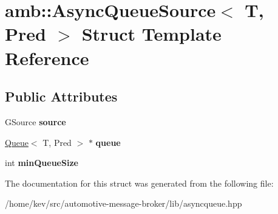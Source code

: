 \hypertarget{structamb_1_1AsyncQueueSource}{\section{amb\+:\+:Async\+Queue\+Source$<$ T, Pred $>$ Struct Template Reference}
\label{structamb_1_1AsyncQueueSource}
}
\subsection*{Public Attributes}
\begin{DoxyCompactItemize}
\item 
\hypertarget{structamb_1_1AsyncQueueSource_a24c5fe3fdd11cfa92ec95ad440966572}{G\+Source {\bfseries source}}\label{structamb_1_1AsyncQueueSource_a24c5fe3fdd11cfa92ec95ad440966572}

\item 
\hypertarget{structamb_1_1AsyncQueueSource_ac43bbfc0e2112f433ef4cb908fb5e8fc}{\hyperlink{classamb_1_1Queue}{Queue}$<$ T, Pred $>$ $\ast$ {\bfseries queue}}\label{structamb_1_1AsyncQueueSource_ac43bbfc0e2112f433ef4cb908fb5e8fc}

\item 
\hypertarget{structamb_1_1AsyncQueueSource_a1659121d3c53ed3aaab7a7fd6226f2ca}{int {\bfseries min\+Queue\+Size}}\label{structamb_1_1AsyncQueueSource_a1659121d3c53ed3aaab7a7fd6226f2ca}

\end{DoxyCompactItemize}


The documentation for this struct was generated from the following file\+:\begin{DoxyCompactItemize}
\item 
/home/kev/src/automotive-\/message-\/broker/lib/asyncqueue.\+hpp\end{DoxyCompactItemize}
